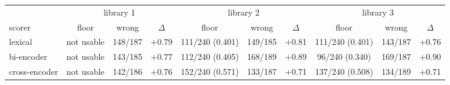 \begin{tabular}{lccccccccc}
\toprule
& \multicolumn{3}{c}{library 1} & \multicolumn{3}{c}{library 2} & \multicolumn{3}{c}{library 3} \\
\cmidrule(lr){2-4}\cmidrule(lr){5-7}\cmidrule(lr){8-10}
scorer & floor & wrong & $\Delta$ & floor & wrong & $\Delta$ & floor & wrong & $\Delta$ \\
\midrule
lexical & not usable & 148/187 & $+$0.79 & 111/240 (0.401) & 149/185 & $+$0.81 & 111/240 (0.401) & 143/187 & $+$0.76 \\
bi-encoder & not usable & 143/185 & $+$0.77 & 112/240 (0.405) & 168/189 & $+$0.89 & 96/240 (0.340) & 169/187 & $+$0.90 \\
cross-encoder & not usable & 142/186 & $+$0.76 & 152/240 (0.571) & 133/187 & $+$0.71 & 137/240 (0.508) & 134/189 & $+$0.71 \\
\bottomrule
\end{tabular}
